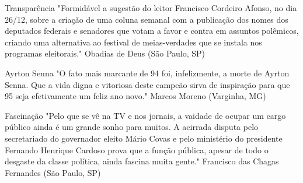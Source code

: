 Transparência
"Formidável a sugestão do leitor Francisco Cordeiro Afonso, no dia 26/12, sobre a criação de uma coluna semanal com a publicação dos nomes dos deputados federais e senadores que votam a favor e contra em assuntos polêmicos, criando uma alternativa ao festival de meias-verdades que se instala nos programas eleitorais."
Obadias de Deus (São Paulo, SP)

Ayrton Senna
"O fato mais marcante de 94 foi, infelizmente, a morte de Ayrton Senna. Que a vida digna e vitoriosa deste campeão sirva de inspiração para que 95 seja efetivamente um feliz ano novo."
Marcos Moreno (Varginha, MG)

Fascinação
"Pelo que se vê na TV e nos jornais, a vaidade de ocupar um cargo público ainda é um grande sonho para muitos. A acirrada disputa pelo secretariado do governador eleito Mário Covas e pelo ministério do presidente Fernando Henrique Cardoso prova que a função pública, apesar de todo o desgaste da classe política, ainda fascina muita gente."
Francisco das Chagas Fernandes (São Paulo, SP)

